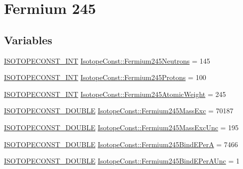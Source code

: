 \hypertarget{group___isotope_const-_fermium-_fm245}{}\section{Fermium 245}
\label{group___isotope_const-_fermium-_fm245}
\subsection*{Variables}
\begin{DoxyCompactItemize}
\item 
\mbox{\hyperlink{group___isotope_const-_macros_ga5f18360b3e99483a35c32d789e62621c}{I\+S\+O\+T\+O\+P\+E\+C\+O\+N\+S\+T\+\_\+\+I\+NT}} \mbox{\hyperlink{group___isotope_const-_fermium-_fm245_gab9fe78c1385f38ccf9b96f01907722ad}{Isotope\+Const\+::\+Fermium245\+Neutrons}} = 145
\item 
\mbox{\hyperlink{group___isotope_const-_macros_ga5f18360b3e99483a35c32d789e62621c}{I\+S\+O\+T\+O\+P\+E\+C\+O\+N\+S\+T\+\_\+\+I\+NT}} \mbox{\hyperlink{group___isotope_const-_fermium-_fm245_gac24d5381fe253c476b0469c58ee0009f}{Isotope\+Const\+::\+Fermium245\+Protons}} = 100
\item 
\mbox{\hyperlink{group___isotope_const-_macros_ga5f18360b3e99483a35c32d789e62621c}{I\+S\+O\+T\+O\+P\+E\+C\+O\+N\+S\+T\+\_\+\+I\+NT}} \mbox{\hyperlink{group___isotope_const-_fermium-_fm245_gae9d2382798d63b1b089557fd4b846007}{Isotope\+Const\+::\+Fermium245\+Atomic\+Weight}} = 245
\item 
\mbox{\hyperlink{group___isotope_const-_macros_ga8f45a7272ce02c0b4c65c44636ed719a}{I\+S\+O\+T\+O\+P\+E\+C\+O\+N\+S\+T\+\_\+\+D\+O\+U\+B\+LE}} \mbox{\hyperlink{group___isotope_const-_fermium-_fm245_ga5a3e9ce06e07683acb499fc5d63a602f}{Isotope\+Const\+::\+Fermium245\+Mass\+Exc}} = 70187
\item 
\mbox{\hyperlink{group___isotope_const-_macros_ga8f45a7272ce02c0b4c65c44636ed719a}{I\+S\+O\+T\+O\+P\+E\+C\+O\+N\+S\+T\+\_\+\+D\+O\+U\+B\+LE}} \mbox{\hyperlink{group___isotope_const-_fermium-_fm245_gaec46110ea3e8e2489aa0bcffb1ba1eed}{Isotope\+Const\+::\+Fermium245\+Mass\+Exc\+Unc}} = 195
\item 
\mbox{\hyperlink{group___isotope_const-_macros_ga8f45a7272ce02c0b4c65c44636ed719a}{I\+S\+O\+T\+O\+P\+E\+C\+O\+N\+S\+T\+\_\+\+D\+O\+U\+B\+LE}} \mbox{\hyperlink{group___isotope_const-_fermium-_fm245_ga8fd5c51a0cda862d13231865851d6bca}{Isotope\+Const\+::\+Fermium245\+Bind\+E\+PerA}} = 7466
\item 
\mbox{\hyperlink{group___isotope_const-_macros_ga8f45a7272ce02c0b4c65c44636ed719a}{I\+S\+O\+T\+O\+P\+E\+C\+O\+N\+S\+T\+\_\+\+D\+O\+U\+B\+LE}} \mbox{\hyperlink{group___isotope_const-_fermium-_fm245_gaab1c8fdcaa38eebfa46b3f15691a3660}{Isotope\+Const\+::\+Fermium245\+Bind\+E\+Per\+A\+Unc}} = 1

\end{DoxyCompactItemize}

